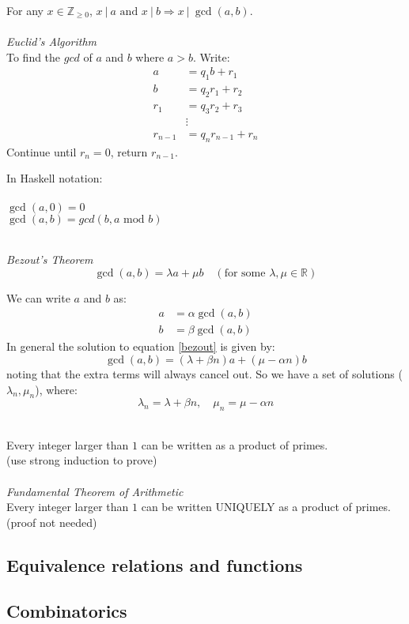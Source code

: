 \documentclass{article}
\newcommand{\R}{\mathbb{R}}
\newcommand{\Z}{\mathbb{Z}}
\begin{document}
For any $ x \in \Z_{\geq 0} $, $ x \ | \ a \textrm{ and } x \ | \ b \Rightarrow x \ | \ \gcd(a, b) $.
\\\\
\textit{Euclid's Algorithm}
\\
To find the $ gcd $ of $ a $ and $ b $ where $ a > b $. Write:
\begin{align}
a & = q_{1} b + r_{1} \\
b & = q_{2} r_{1} + r_{2} \\
r_{1} & = q_{3} r_{2} + r_{3} \\
& \vdots \\
r_{n-1} & = q_{n} r_{n-1} + r_{n}
\end{align}
Continue until $ r_{n} = 0 $, return $ r_{n-1} $.
\\
\begin{tcolorbox}
In Haskell notation:
\\\\
$ \gcd(a, 0) = 0 $
\\
$ \gcd(a, b) = gcd(b, a \textrm{ mod } b) $
\end{tcolorbox}
\noindent
\\
\textit{Bezout's Theorem}
\begin{equation} \label{bezout}
\gcd(a, b) = \lambda a + \mu b \quad (\textrm{for some } \lambda, \mu \in \R)
\end{equation}
\begin{tcolorbox}
We can write $ a $ and $ b $ as:
\begin{align}
a & = \alpha \gcd(a, b) \\
b & = \beta \gcd(a, b)
\end{align}
In general the solution to equation \ref{bezout} is given by:
\begin{equation}
\gcd(a, b) = (\lambda + \beta n) a + (\mu - \alpha n) b
\end{equation}
noting that the extra terms will always cancel out. So we have a set of solutions ($ \lambda_{n}, \mu_{n} $), where:
\begin{equation}
\lambda_{n} = \lambda + \beta n, \quad \mu_{n} = \mu - \alpha n
\end{equation}
\end{tcolorbox}
\noindent
\\
Every integer larger than $ 1 $ can be written as a product of primes.
\\
(use strong induction to prove)
\\\\
\textit{Fundamental Theorem of Arithmetic}
\\
Every integer larger than $ 1 $ can be written UNIQUELY as a product of primes.
\\
(proof not needed)
\subsection{Equivalence relations and functions}
\subsection{Combinatorics}
\end{document}

